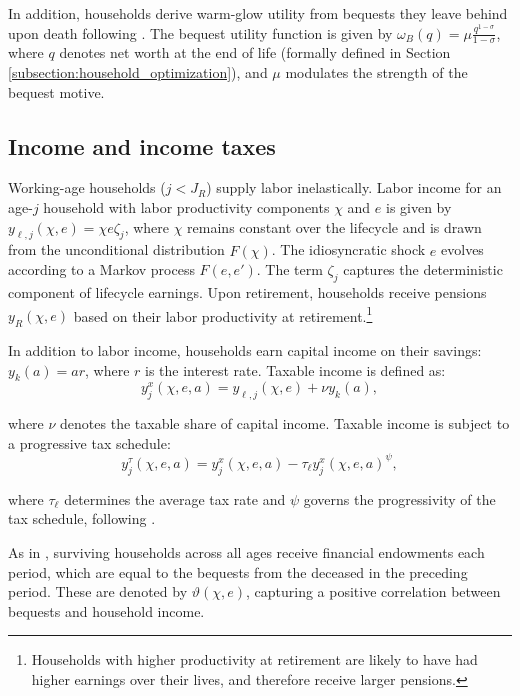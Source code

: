 \documentclass[parskip=full]{article}
\begin{document}
In addition, households derive warm-glow utility from bequests they leave behind upon death following \citet{cagetti-denardi-2006}. The bequest utility function is given by $\omega_{B}(q)=\mu \frac{q^{1-\sigma}}{1-\sigma}$, where $q$ denotes net worth at the end of life (formally defined in Section \ref{subsection:household_optimization}), and $\mu$ modulates the strength of the bequest motive.

\subsection{Income and income taxes}\label{subsection:income}

Working-age households ($j<J_{R}$) supply labor inelastically. Labor income for an age-$j$ household with labor productivity components $\chi$ and $e$ is given by $y_{\ell,j}(\chi,e)=\chi e\zeta_j$, where $\chi$ remains constant over the lifecycle and is drawn from the unconditional distribution $\hat{F}(\chi)$. The idiosyncratic shock $e$ evolves according to a Markov process $F(e,e')$. The term $\zeta_j$ captures the deterministic component of lifecycle earnings. Upon retirement, households receive pensions $y_{R}(\chi,e)$ based on their labor productivity at retirement.\footnote{Households with higher productivity at retirement are likely to have had higher earnings over their lives, and therefore receive larger pensions.}

In addition to labor income, households earn capital income on their savings: $y_{k}(a)=ar$, where $r$ is the interest rate. Taxable income is defined as:
\begin{equation*}\label{eq:taxable_labor_income}
  y^{x}_{j}(\chi,e,a) =y_{\ell,j}(\chi,e)+\nu y_{k}(a),
\end{equation*}

\noindent where $\nu$ denotes the taxable share of capital income. Taxable income is subject to a progressive tax schedule:
\begin{equation}\label{eq:income_tax}
  y^{\tau}_{j}(\chi,e,a) = y^{x}_{j}(\chi,e,a)-\tau_{\ell}y^{x}_{j}(\chi,e,a)^{\psi},
\end{equation}

\noindent where $\tau_{\ell}$ determines the average tax rate and $\psi$ governs the progressivity of the tax schedule, following \citep{hsv-2020}.

As in \citet{kkk-2021}, surviving households across all ages receive financial endowments each period, which are equal to the bequests from the deceased in the preceding period. These are denoted by $\vartheta (\chi,e)$, capturing a positive correlation between bequests and household income.
\end{document}
